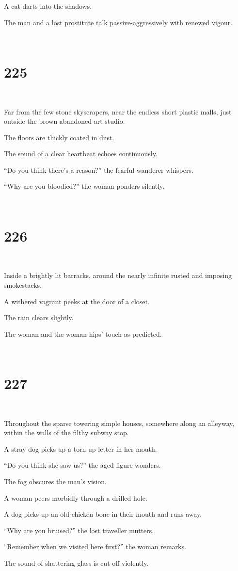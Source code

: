 \documentclass{report}
\begin{document}
A cat darts into the shadows.

The man and a lost prostitute talk passive-aggressively with renewed vigour.

~
\chapter*{225}
~

Far from the few stone skyscrapers, near the endless short plastic malls, just outside the brown abandoned art studio.

The floors are thickly coated in dust.

The sound of a clear heartbeat echoes continuously.

``Do you think there's a reason?'' the fearful wanderer whispers.

``Why are you bloodied?'' the woman ponders silently.

~
\chapter*{226}
~

Inside a brightly lit barracks, around the nearly infinite rusted and imposing smokestacks.

A withered vagrant peeks at the door of a closet.

The rain clears slightly.

The woman and the woman hips' touch as predicted.

~
\chapter*{227}
~

Throughout the sparse towering simple houses, somewhere along an alleyway, within the walls of the filthy subway stop.

A stray dog picks up a torn up letter in her mouth.

``Do you think she saw us?'' the aged figure wonders.

The fog obscures the man's vision.

A woman peers morbidly through a drilled hole.

A dog picks up an old chicken bone in their mouth and runs away.

``Why are you bruised?'' the lost traveller mutters.

``Remember when we visited here first?'' the woman remarks.

The sound of shattering glass is cut off violently.
\end{document}
